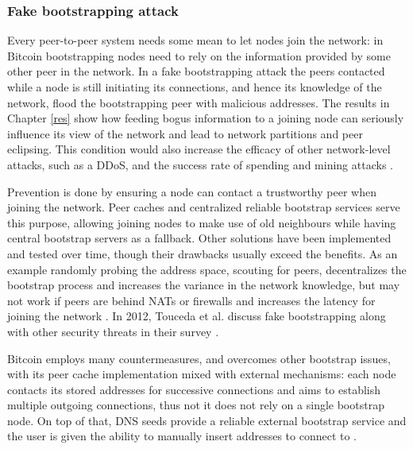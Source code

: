 \documentclass[12pt, letterpaper, twoside]{article}
\begin{document}
\subsubsection{Fake bootstrapping attack}\label{fakeboot}
Every peer-to-peer system needs some mean to let nodes join the network: in Bitcoin bootstrapping nodes need to rely on the information provided by some other peer in the network. In a fake bootstrapping attack the peers contacted while a node is still initiating its connections, and hence its knowledge of the network, flood the bootstrapping peer with malicious addresses. The results in Chapter \ref{res} show how feeding bogus information to a joining node can seriously influence its view of the network and lead to network partitions and peer eclipsing. This condition would also increase the efficacy of other network-level attacks, such as a DDoS, and the success rate of spending and mining attacks \cite{eclipseatk}.

Prevention is done by ensuring a node can contact a trustworthy peer when joining the network. Peer caches and centralized reliable bootstrap services serve this purpose, allowing joining nodes to make use of old neighbours while having central bootstrap servers as a fallback. Other solutions have been implemented and tested over time, though their drawbacks usually exceed the benefits. As an example randomly probing the address space, scouting for peers, decentralizes the bootstrap process and increases the variance in the network knowledge, but may not work if peers are behind NATs or firewalls and increases the latency for joining the network \cite{decentrbootstrapp2p} \cite{localityaware}. In 2012,  Touceda et al. discuss fake bootstrapping along with other security threats in their survey \cite{toucedafakeboot}.

Bitcoin employs many countermeasures, and overcomes other bootstrap issues, with its peer cache implementation mixed with external mechanisms: each node contacts its stored addresses for successive connections and aims to establish multiple outgoing connections, thus not it does not rely on a single bootstrap node. On top of that, DNS seeds provide a reliable external bootstrap service and the user is given the ability to manually insert addresses to connect to \cite{mahmoud_netsec_boot}.
\end{document}
